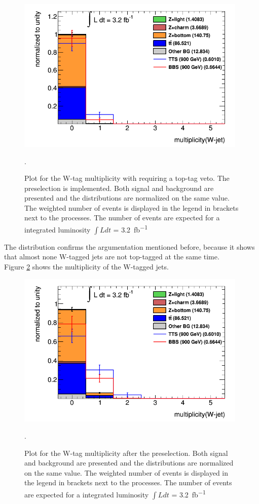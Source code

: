 \begin{figure}[h!]
\centering
\includegraphics[width=11cm]{figures/Wotoptag.png}
\caption{Plot for the W-tag multiplicity with requiring a top-tag veto. The preselection is implemented. 
Both signal and background are presented and the distributions are normalized on the same value. 
The weighted number of events is displayed in the legend in brackets next to the processes. 
The number of events are expected for a integrated luminosity $\int L dt$ = \SI{3.2}{fb^{-1}}}.
\label{bosonmultipli}
\end{figure}

The distribution confirms the argumentation mentioned before, because it shows that almost none W-tagged jets are not top-tagged at the same time.\\
Figure \ref{bosonmultipli} shows the multiplicity of the W-tagged jets.

\begin{figure}[h!]
\centering
\includegraphics[width=11cm]{figures/Wmultiplicity.png}
\caption{Plot for the W-tag multiplicity after the preselection. 
Both signal and background are presented and the distributions are normalized on the same value. 
The weighted number of events is displayed in the legend in brackets next to the processes. 
The number of events are expected for a integrated luminosity $\int L dt$ = \SI{3.2}{fb^{-1}}}.
\label{bosonmultipli}
\end{figure}

